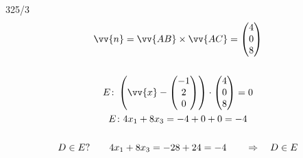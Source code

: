 \begin{exercise}{325/3}
\begin{gather*}
    \vv{n} = \vv{AB} \times \vv{AC} = \begin{pmatrix}4 \\ 0 \\ 8\end{pmatrix} \\\\
    E \colon \left(\vv{x} - \begin{pmatrix}-1 \\ 2 \\ 0\end{pmatrix}\right) \cdot \begin{pmatrix}4 \\ 0 \\ 8\end{pmatrix} = 0 \\
    E \colon 4x_1 + 8x_3 = -4 + 0 + 0 = -4 \\\\
    D \in E? \qquad 4x_1 + 8x_3 = -28 + 24 = -4 \qquad \Rightarrow\quad D \in E
  \end{gather*}
\end{exercise}
